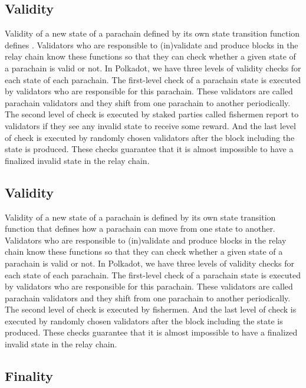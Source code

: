 \subsection{Validity}
 Validity of a new state of a parachain  defined by its own state transition function  defines . Validators who are responsible to (in)validate and produce blocks in the relay chain  know these functions so that they can  check whether a given state of a parachain is valid or not.  In Polkadot, we have three levels of validity checks for each state of each parachain. The first-level check of a parachain state is executed by validators who are responsible for this parachain. These validators are called parachain validators and they shift from one parachain to another  periodically. The second level of check is executed by staked parties called fishermen  report to validators if they see any invalid state to receive some reward. And the last level of check is executed by randomly chosen validators after the block including the state is produced. These checks guarantee that it is almost impossible to have a finalized invalid state in the relay chain.

 \subsection{Validity}
Validity of a new state of a parachain is defined by its own state transition function that defines how a parachain can move from one state to another.   Validators who are responsible to (in)validate and produce blocks in the relay chain  know these functions so that they can  check whether a given state of a parachain is valid or not.  In Polkadot, we have three levels of validity checks for each state of each parachain. The first-level check of a parachain state is executed by validators who are responsible for this parachain. These validators are called parachain validators and they shift from one parachain to another periodically. The second level of check is executed by fishermen. And the last level of check is executed by randomly chosen validators after the block including the state is produced. These checks guarantee that it is almost impossible to have a finalized invalid state in the relay chain.

 \subsection{Finality}

